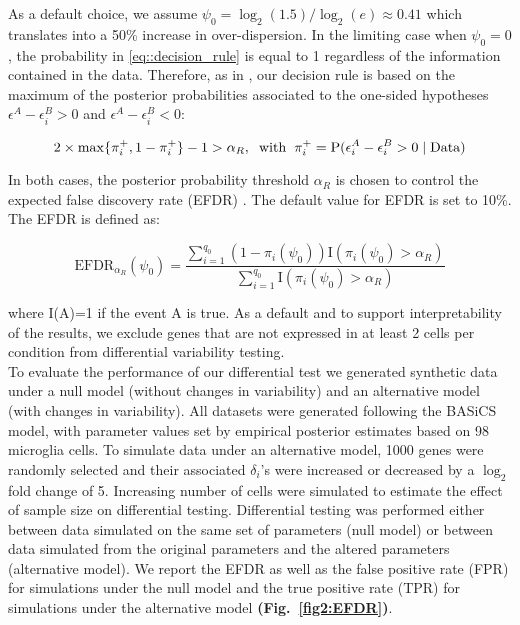As a default choice, we assume $\psi_0 = \log_2(1.5) / \log_2(e) \approx 0.41$ which translates into a 50\% increase in over-dispersion. In the limiting case when $\psi_0 = 0$, the probability in \eqref{eq::decision_rule} is equal to 1 regardless of the information contained in the data. Therefore, as in \cite{Bochkina2007}, our decision rule is based on the maximum of the posterior probabilities associated to the one-sided hypotheses $\epsilon^A - \epsilon^B_i > 0$ and  $\epsilon^A - \epsilon^B_i < 0$:

\begin{equation} \label{eq::decision_rule2} 2 \times \max\{\pi_i^+, 1-\pi_i^+\} - 1  >\alpha_R, \hspace{0.2cm} \text{with} \hspace{0.2cm} \pi_i^+ = \text{P}(\epsilon_i^{A}-\epsilon_i^{B} > 0 \mid \text{Data})
\end{equation}

In both cases, the posterior probability threshold $\alpha_R$ is chosen to control the expected false discovery rate (EFDR) \citep{Newton2004}. The default value for EFDR is set to 10\%. The EFDR is defined as:

\begin{equation}
\text{EFDR}_{\alpha_R}(\psi_0)=\frac{\sum_{i=1}^{q_0}(1-\pi_i(\psi_0))\text{I}(\pi_i(\psi_0)>\alpha_R)}{\sum_{i=1}^{q_0}\text{I}(\pi_i(\psi_0)>\alpha_R)}
\end{equation}

where I(A)=1 if the event A is true. As a default and to support interpretability of the results, we exclude genes that are not expressed in at least 2 cells per condition from differential variability testing.\\

To evaluate the performance of our differential test we generated synthetic data under a null model (without changes in variability) and an alternative model (with changes in variability). All datasets were generated following the BASiCS model, with parameter values set by empirical posterior estimates based on 98 microglia cells. To simulate data under an alternative model, 1000 genes were randomly selected and their associated $\delta_i$'s were increased or decreased by a $\log_2$ fold change of 5. Increasing number of cells were simulated to estimate the effect of sample size on differential testing. Differential testing was performed either between data simulated on the same set of parameters (null model) or between data simulated from the original parameters and the altered parameters (alternative model). We report the EFDR \citep{Newton2004} as well as the false positive rate (FPR) for simulations under the null model and the true positive rate (TPR) for simulations under the alternative model \textbf{(Fig.~\ref{fig2:EFDR})}. 

